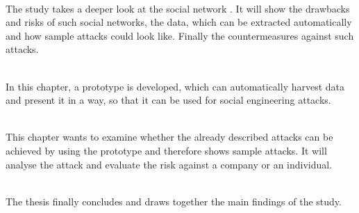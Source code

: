 \vspace{0.5em}\\
\noindent The study takes a deeper look at the social network \Twitter. It will
show the drawbacks and risks of such social networks, the data, which can be
extracted automatically and how sample attacks could look like. Finally the
countermeasures against such attacks.

\vspace{0.5em}\\
\noindent In this chapter, a prototype is developed, which can automatically harvest data and
present it in a way, so that it can be used for social engineering attacks.

\vspace{0.5em}\\
\noindent This chapter wants to examine whether the already described attacks
can be achieved by using the prototype and therefore shows sample attacks. It
will analyse the attack and evaluate the risk against a company or an
individual.

\vspace{0.5em}\\
\noindent The thesis finally concludes and draws together the main findings of the
study.

\def\chapterautorefname{\oldchapterautorefname}
\newpage

